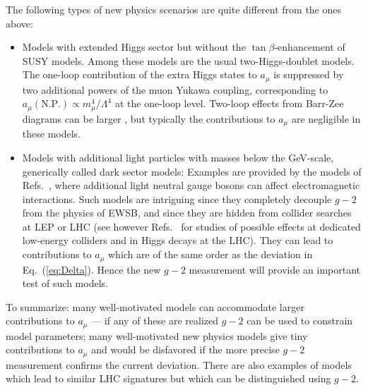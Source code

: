 %
The following types of new physics scenarios are quite different from
the ones above:
\begin{itemize}
\item Models with extended Higgs sector but without the
  $\tan\beta$-enhancement of SUSY models. Among these models are the
  usual two-Higgs-doublet models. The one-loop contribution
  of the extra Higgs states to $a_\mu$ is suppressed by two additional powers of
  the muon Yukawa coupling, corresponding to $a_\mu(\mbox{N.P.})\propto
  m_\mu^4/\Lambda^4$ at the one-loop level. Two-loop effects from
  Barr-Zee diagrams can be larger \cite{Krawczyk:2002df}, but typically the
  contributions to   $a_\mu$ are negligible in these models.
\item Models with additional light particles with masses below the
  GeV-scale, generically called dark sector models: Examples are
  provided by the  models of   Refs.\
  \cite{Pospelov:2008zw,Davoudiasl:2012qa}, where additional light
  neutral gauge bosons can affect electromagnetic interactions. Such
  models are intriguing since 
  they completely decouple $g-2$ from the physics of EWSB, and since
  they are hidden from collider searches at LEP or LHC (see however
  Refs.\ \cite{Essig:2009nc,Davoudiasl:2012ig} for studies of possible
  effects at dedicated low-energy colliders and in Higgs decays at the
  LHC). They can lead to
  contributions to $a_\mu$ which are of the same order as the deviation
  in Eq.~(\ref{eq:Delta}). Hence the new $g-2$ measurement will provide
  an important test of such models.
\end{itemize}
To summarize:
many well-motivated models can accommodate larger contributions to
$a_\mu$ --- if any of these are realized $g-2$ can be used to constrain
model parameters; many well-motivated new physics models
give tiny contributions to $a_\mu$ and would be disfavored if the
more precise $g-2$ measurement confirms the current deviation. There are also examples of models which lead to
similar LHC signatures but which can be distinguished using $g-2$.


